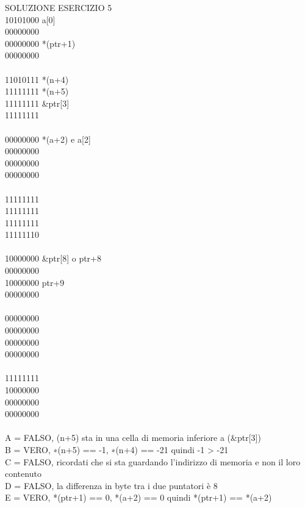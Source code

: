 \begin{minipage}[h]{\linewidth}
SOLUZIONE ESERCIZIO 5\\


10101000\hspace{2em}    a[0]\\
00000000\\    
00000000\hspace{2em}    *(ptr+1)\\
00000000\\
\\
11010111\hspace{2em}    *(n+4)\\
11111111\hspace{2em}    *(n+5)\\
11111111\hspace{2em}    \&ptr[3]\\
11111111\\
\\
00000000\hspace{2em}    *(a+2) e a[2]\\
00000000\\
00000000\\
00000000\\
\\
11111111\\
11111111\\
11111111\\
11111110\\
\\
10000000\hspace{2em}    \&ptr[8] o ptr+8\\
00000000\\
10000000\hspace{2em}    ptr+9\\
00000000\\
\\
00000000\\
00000000\\
00000000\\
00000000\\
\\
11111111\\
10000000\\
00000000\\
00000000\\
\\

A = FALSO, (n+5) sta in una cella di memoria inferiore a (\&ptr[3])\\
B = VERO, ∗(n+5) == -1, ∗(n+4) == -21 quindi -1 > -21\\
C = FALSO, ricordati che si sta guardando l'indirizzo di memoria e non il loro contenuto\\
D = FALSO, la differenza in byte tra i due puntatori è 8\\
E = VERO, *(ptr+1) == 0, *(a+2) == 0 quindi *(ptr+1) == *(a+2)\\

\end{minipage}
